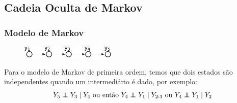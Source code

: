 \subsection{Cadeia Oculta de Markov}
\begin{frame}[allowframebreaks]
  \frametitle{Modelo de Markov}
        \begin{figure}[h!]
        \centering
        \includegraphics[width=0.4\textwidth]{images/mm.pdf}
        \label{fig:mm}
        \end{figure}
  Para o modelo de Markov de primeira ordem, temos que dois estados são independentes quando um intermediário é dado, por exemplo:
	\begin{equation}
	Y_5 \independent Y_3 \mid Y_4 \text{ ou então } Y_4 \independent Y_1 \mid Y_{2:3} \text{ ou } Y_4 \independent Y_1 \mid Y_2
	\end{equation}
\end{frame}



